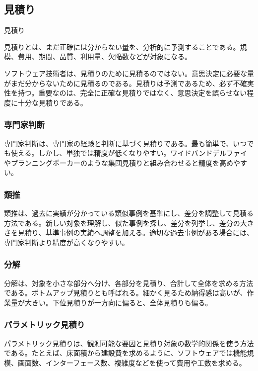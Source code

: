 \subsection{見積り}

\begin{definitionbox}見積り\par\smallskip
見積りとは、まだ正確には分からない量を、分析的に予測することである。規模、費用、期間、品質、利用量、欠陥数などが対象になる。
\end{definitionbox}

ソフトウェア技術者は、見積りのために見積るのではない。意思決定に必要な量がまだ分からないために見積るのである。見積りは予測であるため、必ず不確実性を持つ。重要なのは、完全に正確な見積りではなく、意思決定を誤らせない程度に十分な見積りである。

\subsubsection{専門家判断}

専門家判断は、専門家の経験と判断に基づく見積りである。最も簡単で、いつでも使える。しかし、単独では精度が低くなりやすい。ワイドバンドデルファイやプランニングポーカーのような集団見積りと組み合わせると精度を高めやすい。

\subsubsection{類推}

類推は、過去に実績が分かっている類似事例を基準にし、差分を調整して見積る方法である。新しい対象を理解し、似た事例を探し、差分を列挙し、差分の大きさを見積り、基準事例の実績へ調整を加える。適切な過去事例がある場合には、専門家判断より精度が高くなりやすい。

\subsubsection{分解}

分解は、対象を小さな部分へ分け、各部分を見積り、合計して全体を求める方法である。ボトムアップ見積りとも呼ばれる。細かく見るため納得感は高いが、作業量が大きい。下位見積りが一方向に偏ると、全体見積りも偏る。

\subsubsection{パラメトリック見積り}

パラメトリック見積りは、観測可能な要因と見積り対象の数学的関係を使う方法である。たとえば、床面積から建設費を求めるように、ソフトウェアでは機能規模、画面数、インターフェース数、複雑度などを使って費用や工数を求める。

